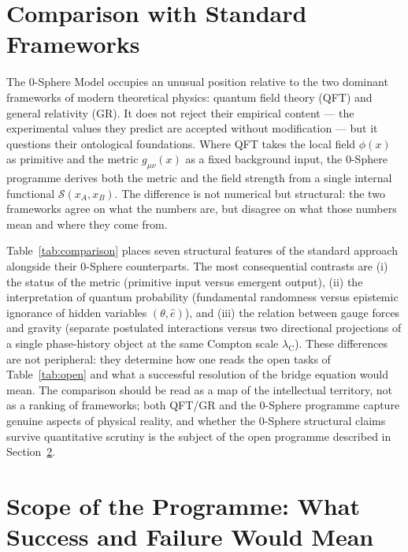 \documentclass[12pt,letterpaper]{article}
\newcommand{\lambdaC}{\lambda_{\mathrm{C}}}
\newcommand{\calS}{\mathcal{S}}
\newcommand{\iphase}{\theta}
\begin{document}
\clearpage
\section{Comparison with Standard Frameworks}
\label{sec:comparison}

The 0-Sphere Model occupies an unusual position relative to the two dominant frameworks of modern theoretical physics: quantum field theory (QFT) and general relativity (GR). It does not reject their empirical content --- the experimental values they predict are accepted without modification --- but it questions their ontological foundations. Where QFT takes the local field $\phi(x)$ as primitive and the metric $g_{\mu\nu}(x)$ as a fixed background input, the 0-Sphere programme derives both the metric and the field strength from a single internal functional $\calS(x_A,x_B)$. The difference is not numerical but structural: the two frameworks agree on what the numbers are, but disagree on what those numbers mean and where they come from.

Table~\ref{tab:comparison} places seven structural features of the standard approach alongside their 0-Sphere counterparts. The most consequential contrasts are (i) the status of the metric (primitive input versus emergent output), (ii) the interpretation of quantum probability (fundamental randomness versus epistemic ignorance of hidden variables $(\iphase,\hat{e})$), and (iii) the relation between gauge forces and gravity (separate postulated interactions versus two directional projections of a single phase-history object at the same Compton scale $\lambdaC$). These differences are not peripheral: they determine how one reads the open tasks of Table~\ref{tab:open} and what a successful resolution of the bridge equation would mean. The comparison should be read as a map of the intellectual territory, not as a ranking of frameworks; both QFT/GR and the 0-Sphere programme capture genuine aspects of physical reality, and whether the 0-Sphere structural claims survive quantitative scrutiny is the subject of the open programme described in Section~\ref{sec:scope}.

\section{Scope of the Programme: What Success and Failure Would Mean}
\label{sec:scope}
\end{document}
